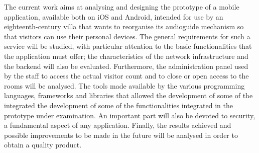 The current work aims at analysing and designing the prototype of a mobile application, available both on iOS and Android, intended for use by an eighteenth-century villa that wants to reorganise its audioguide mechanism so that visitors can use their personal devices.
The general requirements for such a service will be studied, with particular attention to the basic functionalities that the application must offer; the characteristics of the network infrastructure and the backend will also be evaluated. Furthermore, the administration panel used by the staff to access the actual visitor count and to close or open access to the rooms will be analysed. The tools made available by the various programming languages, frameworks and libraries that allowed the development of some of the integrated
the development of some of the functionalities integrated in the prototype under examination. An important part will also be devoted to security, a fundamental aspect of any application. Finally, the results achieved and possible improvements to be made in the future will be analysed in order to obtain a quality product.



